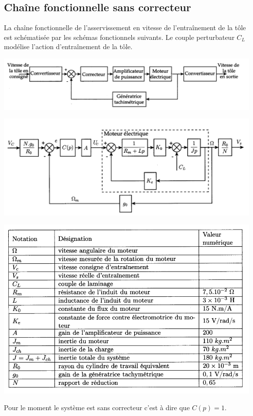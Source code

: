 \documentclass[11pt,oneside]{article}
\begin{document}

\subsection{Chaîne fonctionnelle sans correcteur}

La chaîne fonctionnelle de l'asservissement en vitesse de l'entraînement de la tôle est schématisée par les schémas fonctionnels suivants. Le couple perturbateur $C_L$ modélise l'action d'entraînement de la tôle.

\begin{center}
\includegraphics[width=.8\textwidth]{png/figure_05}

\includegraphics[width=.8\textwidth]{png/figure_06}

\includegraphics[width=.8\textwidth]{png/figure_07}
\end{center}

Pour le moment le système est sans correcteur c'est à dire que $C(p) = 1$.
\end{document}
